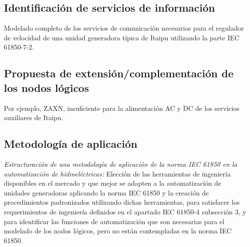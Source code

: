 	\subsection{Identificaci\'on de servicios de informaci\'on}
		Modelado completo de los servicios de comunicaci\'on necesarios para el
		regulador de velocidad de una unidad generadora t\'ipica de Itaipu
		utilizando la parte IEC 61850-7-2.
	\subsection{Propuesta de extensi\'on/complementaci\'on de los nodos l\'ogicos}
		Por ejemplo, ZAXN, insuficiente para la alimentaci\'on AC y DC de los
		servicios auxiliares de Itaipu. 
	\subsection{Metodolog\'ia de aplicaci\'on }
		\emph{Estructuraci\'on de una metodolog\'ia de aplicaci\'on de la norma
		IEC 61850 en la automatizaci\'on de hidroel\'ectricas:} Elecci\'on de las
		herramientas de ingenier\'ia disponibles en el mercado y que mejor se adapten
		a la automatizaci\'on de unidades generadoras aplicando la norma IEC 61850 y
		la creaci\'on de procedimientos padronizados utilizando dichas herramientas,
		para satisfacer los requerimientos de ingenier\'ia definidos en el apartado
		IEC 61850-4 subsecci\'on 3, y para identificar las funciones de
		automatizaci\'on que son necesarias para el modelado de los nodos l\'ogicos,
		pero no est\'an contempladas en la norma IEC 61850.
